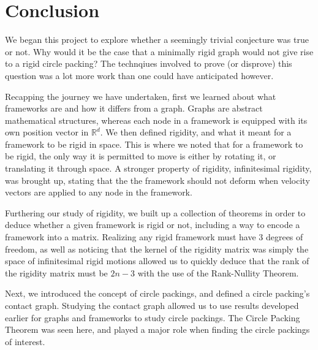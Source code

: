 \chapter{Conclusion}

\begin{flushleft}
We began this project to explore whether a seemingly trivial conjecture was true or not. Why would it be the case that a minimally rigid graph would not give rise to a rigid circle packing? The technqiues involved to prove (or disprove) this question was a lot more work than one could have anticipated however.
\end{flushleft}

\begin{flushleft}
Recapping the journey we have undertaken, first we learned about what frameworks are and how it differs from a graph. Graphs are abstract mathematical structures, whereas each node in a framework is equipped with its own position vector in $\mathbb{R}^d$. We then defined rigidity, and what it meant for a framework to be rigid in space. This is where we noted that for a framework to be rigid, the only way it is permitted to move is either by rotating it, or translating it through space. A stronger property of rigidity, infinitesimal rigidity, was brought up, stating that the the framework should not deform when velocity vectors are applied to any node in the framework.
\end{flushleft}

\begin{flushleft}
Furthering our study of rigidity, we built up a collection of theorems in order to deduce whether a given framework is rigid or not, including a way to encode a framework into a matrix. Realizing any rigid framework must have 3 degrees of freedom, as well as noticing that the kernel of the rigidity matrix was simply the space of infinitesimal rigid motions allowed us to quickly deduce that the rank of the rigidity matrix must be $2n-3$ with the use of the Rank-Nullity Theorem. 
\end{flushleft}

\begin{flushleft}
Next, we introduced the concept of circle packings, and defined a circle packing's contact graph. Studying the contact graph allowed us to use results developed earlier for graphs and frameworks to study circle packings. The Circle Packing Theorem was seen here, and played a major role when finding the circle packings of interest. 
\end{flushleft}

